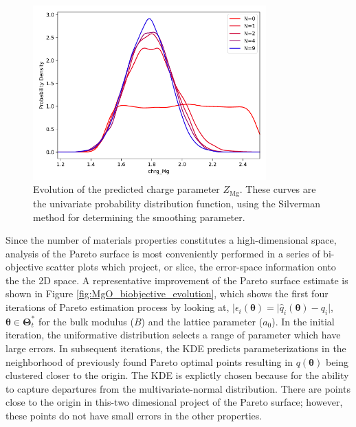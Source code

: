 \begin{figure}[ht]
	\centering
  \includegraphics[width=0.8\textwidth]{chapter7/Z_Mg_evolution}
  \caption{Evolution of the predicted charge parameter $Z_{\text{Mg}}$.  These curves are the univariate probability distribution function, using the Silverman method for determining the smoothing parameter.}
  \label{fig:Z_Mg_evolution}
\end{figure}

Since the number of materials properties constitutes a high-dimensional space, analysis of the Pareto surface is most conveniently performed in a series of bi-objective scatter plots which project, or slice, the error-space information onto the the 2D space.  A representative improvement of the Pareto surface estimate is shown in Figure \ref{fig:MgO_biobjective_evolution}, which shows the first four iterations of Pareto estimation process by looking at,
$|\epsilon_i(\bm{\theta})=|\hat{q}_i(\bm{\theta})-q_i|$, $\bm{\theta}\in\bm{\Theta}_t^*$ for the bulk modulus ($B$) and the lattice parameter ($a_0$). In the initial iteration, the uniformative distribution selects a range of parameter which have large errors.  In subsequent iterations, the KDE predicts parameterizations in the neighborhood of previously found Pareto optimal points resulting in $q(\bm{\theta})$ being clustered closer to the origin.   The KDE is explictly chosen because for the ability to capture departures from the multivariate-normal distribution.  There are points close to the origin in this-two dimesional project of the Pareto surface; however, these points do not have small errors in the other properties.

